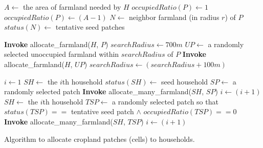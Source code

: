 \documentclass[12pt, titlepage]{article}
\newenvironment{Algorithm}[2][tbh]%
{\begin{myalgo}[#1]
\centering
\begin{minipage}{#2}
\begin{algorithm}[H]}%
{\end{algorithm}
\end{minipage}
\end{myalgo}}
\begin{document}
\begin{Algorithm}[t]{14cm} 
\begin{algorithmic}[1] 
 
\State $A \leftarrow $ the area of farmland needed by $H$ 
\State $occupiedRatio(P) \leftarrow 1 $ 
\Else \State $occupiedRatio(P) \leftarrow (A - 1)$  
\EndIf 
\State $N \leftarrow $ neighbor farmland (in radius $r$) of $P$  
\State $status(N) \leftarrow $ tentative seed patches 
\EndProcedure 
\Statex

  
\State \textbf{Invoke} allocate\_farmland($H$, $P$) 
\Repeat
\State $searchRadius \leftarrow 700m $  
\State $UP \leftarrow $ a randomly selected unoccupied farmland within $searchRadius$ of $P$ 
\State \textbf{Invoke} allocate\_farmland($H$, $UP$) 
\State $searchRadius \leftarrow (searchRadius + 100m) $ 
\EndIf 
{} 
\EndProcedure 
\Statex

\State $i \leftarrow 1$  
\Repeat 
\State $SH \leftarrow $ the $i$th household 
\State $status(SH) \leftarrow $ seed household 
\State $SP \leftarrow $ a randomly selected patch 
\State \textbf{Invoke} allocate\_many\_farmland($SH$, $SP$) 
\State $i \leftarrow (i+1) $ 
 \Repeat 
\State $SH \leftarrow $ the $i$th household 
\State $TSP \leftarrow $ a randomly selected patch so that $status(TSP) == $ tentative seed patch $\wedge$
$occupiedRatio(TSP) == 0$ 
\State \textbf{Invoke} allocate\_many\_farmland($SH$, $TSP$) 
\State $i \leftarrow (i+1) $
\EndProcedure

\end{algorithmic} 
\caption{Algorithm to allocate cropland patches (cells) to households.} 
\label{alg1} 
\end{Algorithm}
\end{document}
